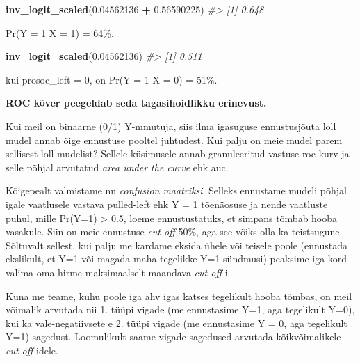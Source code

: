 \documentclass[]{book}
\newenvironment{Shaded}{\begin{snugshade}}{\end{snugshade}}
\newcommand{\CommentTok}[1]{\textcolor[rgb]{0.56,0.35,0.01}{\textit{#1}}}
\newcommand{\FloatTok}[1]{\textcolor[rgb]{0.00,0.00,0.81}{#1}}
\newcommand{\KeywordTok}[1]{\textcolor[rgb]{0.13,0.29,0.53}{\textbf{#1}}}
\newcommand{\NormalTok}[1]{#1}
\newcommand{\OperatorTok}[1]{\textcolor[rgb]{0.81,0.36,0.00}{\textbf{#1}}}
\newcommand{\StringTok}[1]{\textcolor[rgb]{0.31,0.60,0.02}{#1}}
\begin{document}
\begin{Shaded}
\begin{Highlighting}[]
\KeywordTok{inv_logit_scaled}\NormalTok{(}\FloatTok{0.04562136} \OperatorTok{+}\StringTok{ }\FloatTok{0.56590225}\NormalTok{)}
\CommentTok{#> [1] 0.648}
\end{Highlighting}
\end{Shaded}

Pr(Y = 1 \textbar{} X = 1) = 64\%.

\begin{Shaded}
\begin{Highlighting}[]
\KeywordTok{inv_logit_scaled}\NormalTok{(}\FloatTok{0.04562136}\NormalTok{)}
\CommentTok{#> [1] 0.511}
\end{Highlighting}
\end{Shaded}

kui prosoc\_left = 0, on Pr(Y = 1 \textbar{} X = 0) = 51\%.

\textbf{ROC kõver peegeldab seda tagasihoidlikku erinevust.}

Kui meil on binaarne (0/1) Y-mmutuja, siis ilma igasuguse ennustusjõuta loll mudel annab õige ennustuse pooltel juhtudest. Kui palju on meie mudel parem sellisest loll-mudelist? Sellele küsimusele annab granuleeritud vastuse roc kurv ja selle põhjal arvutatud \emph{area under the curve} ehk auc.

Kõigepealt valmistame nn \emph{confusion maatriksi}. Selleks ennustame mudeli põhjal igale vaatlusele vastava pulled-left ehk Y = 1 tõenäosuse ja nende vaatluste puhul, mille Pr(Y=1) \textgreater{} 0.5, loeme ennustustatuks, et simpans tõmbab hooba vasakule. Siin on meie ennustuse \emph{cut-off} 50\%, aga see võiks olla ka teistsugune. Sõltuvalt sellest, kui palju me kardame eksida ühele või teisele poole (ennustada ekslikult, et Y=1 või magada maha tegelikke Y=1 sündmusi) peaksime iga kord valima oma hirme maksimaalselt maandava \emph{cut-off}-i.

Kuna me teame, kuhu poole iga ahv igas katses tegelikult hooba tõmbas, on meil võimalik arvutada nii 1. tüüpi vigade (me ennustasime Y=1, aga tegelikult Y=0), kui ka vale-negatiivsete e 2. tüüpi vigade (me ennustasime Y = 0, aga tegelikult Y=1) sagedust. Loomulikult saame vigade sagedused arvutada kõikvõimalikele \emph{cut-off}-idele.
\end{document}
